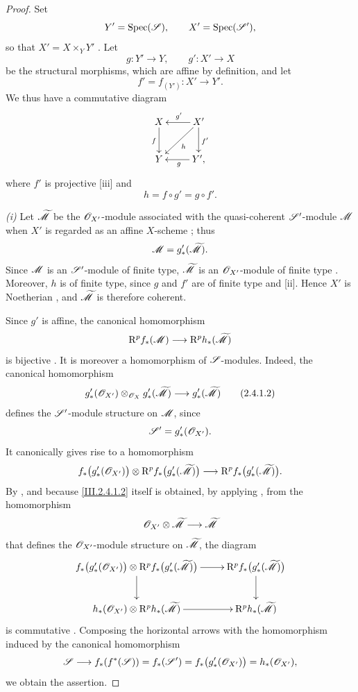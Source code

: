\begin{proof}
Set
\[
  Y'=\operatorname{Spec}(\mathscr{S}),\qquad X'=\operatorname{Spec}(\mathscr{S}'),
\]
so that $X'=X\times_Y Y'$ .
Let
\[
  g:Y'\longrightarrow Y,\qquad g':X'\longrightarrow X
\]
be the structural morphisms, which are affine by definition, and let
\[
  f'=f_{(Y')}:X'\longrightarrow Y'.
\]
We thus have a commutative diagram
\[
  \xymatrix{
    X\ar[d]_f &
    X'\ar[l]_{g'}\ar[d]^{f'}\ar[dl]^{h}\\
    Y &
    Y'\ar[l]^{g},
  }
\]
where $f'$ is projective [iii] and
\[
  h=f\circ g'=g\circ f'.
\]

\emph{(i)} Let $\widetilde{\mathscr{M}}$ be the $\mathscr{O}_{X'}$-module associated with the quasi-coherent $\mathscr{S}'$-module $\mathscr{M}$ when $X'$ is regarded as an affine $X$-scheme ; thus
\[
  \mathscr{M}=g'_*(\widetilde{\mathscr{M}}).
\]
Since $\mathscr{M}$ is an $\mathscr{S}'$-module of finite type, $\widetilde{\mathscr{M}}$ is an $\mathscr{O}_{X'}$-module of finite type .
Moreover, $h$ is of finite type, since $g$ and $f'$ are of finite type  and [ii].
Hence $X'$ is Noetherian , and $\widetilde{\mathscr{M}}$ is therefore coherent.

Since $g'$ is affine, the canonical homomorphism
\[
  \mathrm{R}^p f_*(\mathscr{M})
  \longrightarrow
  \mathrm{R}^p h_*(\widetilde{\mathscr{M}})
\]
is bijective .
It is moreover a homomorphism of $\mathscr{S}$-modules.
Indeed, the canonical homomorphism
\[
\label{III.2.4.1.2}
  g'_*(\mathscr{O}_{X'})
  \otimes_{\mathscr{O}_X}
  g'_*(\widetilde{\mathscr{M}})
  \longrightarrow
  g'_*(\widetilde{\mathscr{M}})
  \tag{2.4.1.2}
\]
defines the $\mathscr{S}'$-module structure on $\mathscr{M}$, since
\[
  \mathscr{S}'=g'_*(\mathscr{O}_{X'}).
\]
It canonically gives rise to a homomorphism
\[
  f_*\bigl(g'_*(\mathscr{O}_{X'})\bigr)
  \otimes
  \mathrm{R}^p f_*\bigl(g'_*(\widetilde{\mathscr{M}})\bigr)
  \longrightarrow
  \mathrm{R}^p f_*\bigl(g'_*(\widetilde{\mathscr{M}})\bigr).
\]
By , and because \eqref{III.2.4.1.2} itself is obtained, by applying , from the homomorphism
\[
  \mathscr{O}_{X'}\otimes\widetilde{\mathscr{M}}
  \longrightarrow\widetilde{\mathscr{M}}
\]
that defines the $\mathscr{O}_{X'}$-module structure on $\widetilde{\mathscr{M}}$, the diagram
\[
  \xymatrix{
    f_*\bigl(g'_*(\sh{O}_{X'})\bigr)
    \otimes\RR^p f_*\bigl(g'_*(\widetilde{\sh{M}})\bigr)
    \ar[r]\ar[d] &
    \RR^p f_*\bigl(g'_*(\widetilde{\sh{M}})\bigr)\ar[d]\\
    h_*(\sh{O}_{X'})
    \otimes\RR^p h_*(\widetilde{\sh{M}})
    \ar[r] &
    \RR^p h_*(\widetilde{\sh{M}})
  }
\]
is commutative .
Composing the horizontal arrows with the homomorphism induced by the canonical homomorphism
\[
  \mathscr{S}
  \longrightarrow f_*(f^*(\mathscr{S}))
  =f_*(\mathscr{S}')
  =f_*\bigl(g'_*(\mathscr{O}_{X'})\bigr)
  =h_*(\mathscr{O}_{X'}),
\]
we obtain the assertion.


\end{proof}
